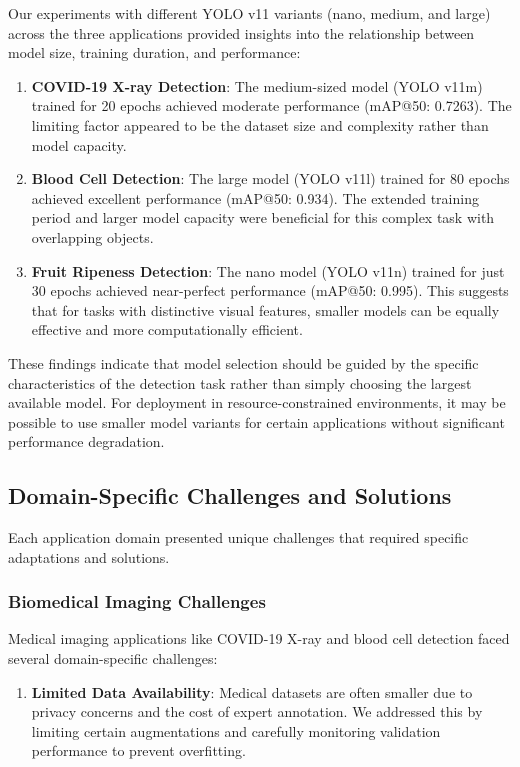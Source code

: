 \begin{multicols}{2}
Our experiments with different YOLO v11 variants (nano, medium, and large) across the three applications provided insights into the relationship between model size, training duration, and performance:

\begin{enumerate}
    \item \textbf{COVID-19 X-ray Detection}: The medium-sized model (YOLO v11m) trained for 20 epochs achieved moderate performance (mAP@50: 0.7263). The limiting factor appeared to be the dataset size and complexity rather than model capacity.
    
    \item \textbf{Blood Cell Detection}: The large model (YOLO v11l) trained for 80 epochs achieved excellent performance (mAP@50: 0.934). The extended training period and larger model capacity were beneficial for this complex task with overlapping objects.
    
    \item \textbf{Fruit Ripeness Detection}: The nano model (YOLO v11n) trained for just 30 epochs achieved near-perfect performance (mAP@50: 0.995). This suggests that for tasks with distinctive visual features, smaller models can be equally effective and more computationally efficient.
\end{enumerate}

These findings indicate that model selection should be guided by the specific characteristics of the detection task rather than simply choosing the largest available model. For deployment in resource-constrained environments, it may be possible to use smaller model variants for certain applications without significant performance degradation.

\subsection{Domain-Specific Challenges and Solutions}

Each application domain presented unique challenges that required specific adaptations and solutions.

\subsubsection{Biomedical Imaging Challenges}

Medical imaging applications like COVID-19 X-ray and blood cell detection faced several domain-specific challenges:

\begin{enumerate}
    \item \textbf{Limited Data Availability}: Medical datasets are often smaller due to privacy concerns and the cost of expert annotation. We addressed this by limiting certain augmentations and carefully monitoring validation performance to prevent overfitting.
    

\end{enumerate}
\end{multicols}
